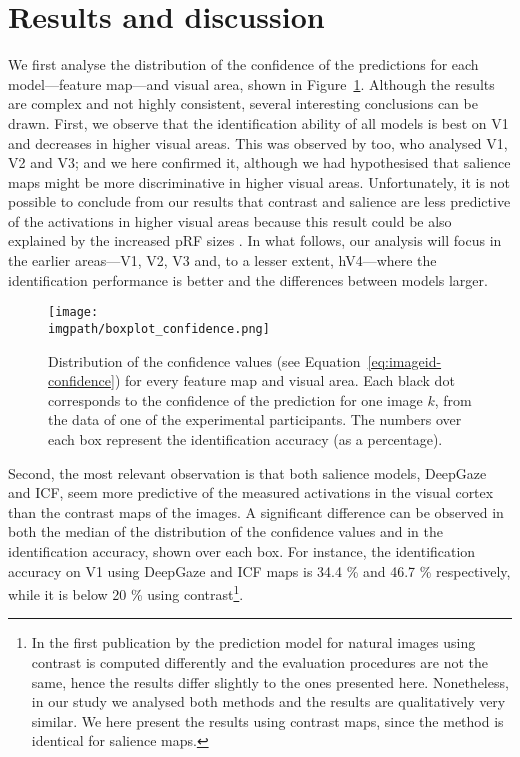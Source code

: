 {\section{Results and discussion}
\label{sec:imageid-results}
We first analyse the distribution of the confidence of the predictions for each model---feature map---and visual area, shown in Figure~\ref{fig:imageid-boxplot_confidence}. Although the results are complex and not highly consistent, several interesting conclusions can be drawn. First, we observe that the identification ability of all models is best on V1 and decreases in higher visual areas. This was observed by \citep{zuiderbaan2017imageidentification} too, who analysed V1, V2 and V3; and we here confirmed it, although we had hypothesised that salience maps might be more discriminative in higher visual areas. Unfortunately, it is not possible to conclude from our results that contrast and salience are less predictive of the activations in higher visual areas because this result could be also explained by the increased pRF sizes \citep{smith2001rfsizes}. In what follows, our analysis will focus in the earlier areas---V1, V2, V3 and, to a lesser extent, hV4---where the identification performance is better and the differences between models larger.

\begin{figure}[htb]
  \begin{center}
    \texttt{[image: \\imgpath/boxplot\_confidence.png]}
  \end{center}
  \caption{Distribution of the confidence values (see Equation~\ref{eq:imageid-confidence}) for every feature map and visual area. Each black dot corresponds to the confidence of the prediction for one image $k$, from the data of one of the experimental participants. The numbers over each box represent the identification accuracy (as a percentage).}
\label{fig:imageid-boxplot_confidence}
\end{figure}

Second, the most relevant observation is that both salience models, DeepGaze and ICF, seem more predictive of the measured activations in the visual cortex than the contrast maps of the images. A significant difference can be observed in both the median of the distribution of the confidence values and in the identification accuracy, shown over each box. For instance, the identification accuracy on V1 using DeepGaze and ICF maps is 34.4 \% and 46.7 \% respectively, while it is below 20 \% using contrast\footnote{In the first publication by \citet{zuiderbaan2017imageidentification} the prediction model for natural images using contrast is computed differently and the evaluation procedures are not the same, hence the results differ slightly to the ones presented here. Nonetheless, in our study we analysed both methods and the results are qualitatively very similar. We here present the results using contrast maps, since the method is identical for salience maps.}.

}
